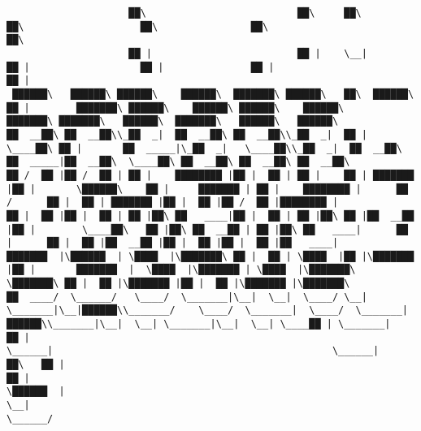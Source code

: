 \documentclass[varwidth=\maxdimen,margin=0.5cm,multi={verbatim}]{standalone}
\begin{document}
\begin{verbatim}
                     ██\                          ██\     ██\           ██\                    ██\                ██\                               ██\
                     ██ |                         ██ |    \__|          ██ |                   ██ |               ██ |                              ██ |
 ██████\   ██████\ ██████\    ██████\  ███████\ ██████\   ██\  ██████\  ██ |        ███████\ ██████\    ██████\ ██████\    ██████\         ███████\ ███████\   ██████\  ███████\   ██████\   ██████\
██  __██\ ██  __██\\_██  _|  ██  __██\ ██  __██\\_██  _|  ██ | \____██\ ██ |       ██  _____|\_██  _|   \____██\\_██  _|  ██  __██\       ██  _____|██  __██\  \____██\ ██  __██\ ██  __██\ ██  __██\
██ /  ██ |██ /  ██ | ██ |    ████████ |██ |  ██ | ██ |    ██ | ███████ |██ |       \██████\    ██ |     ███████ | ██ |    ████████ |      ██ /      ██ |  ██ | ███████ |██ |  ██ |██ /  ██ |████████ |
██ |  ██ |██ |  ██ | ██ |██\ ██   ____|██ |  ██ | ██ |██\ ██ |██  __██ |██ |        \____██\   ██ |██\ ██  __██ | ██ |██\ ██   ____|      ██ |      ██ |  ██ |██  __██ |██ |  ██ |██ |  ██ |██   ____|
███████  |\██████  | \████  |\███████\ ██ |  ██ | \████  |██ |\███████ |██ |       ███████  |  \████  |\███████ | \████  |\███████\       \███████\ ██ |  ██ |\███████ |██ |  ██ |\███████ |\███████\
██  ____/  \______/   \____/  \_______|\__|  \__|  \____/ \__| \_______|\__|██████\\_______/    \____/  \_______|  \____/  \_______|██████\\_______|\__|  \__| \_______|\__|  \__| \____██ | \_______|
██ |                                                                        \______|                                                \______|                                      ██\   ██ |
██ |                                                                                                                                                                              \██████  |
\__|                                                                                                                                                                               \______/



\end{verbatim}
\end{document}
